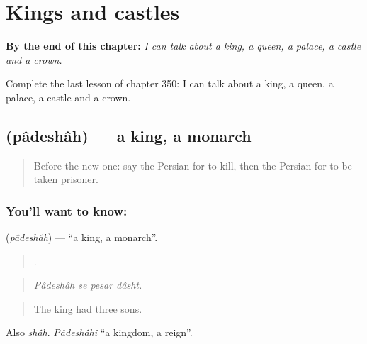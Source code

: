 
\chapter{Kings and castles}
\label{ch:fa-kings-and-castles}

\begin{chapteropening}
\textbf{By the end of this chapter:} \emph{I can talk about a king, a queen, a palace, a castle and a crown.}

Complete the last lesson of chapter 350: I can talk about a king, a queen, a palace, a castle and a crown.
\end{chapteropening}

\section[\texorpdfstring{\fa{پادشاه} (pâdeshâh)}{پادشاه (pâdeshâh)}]{ (pâdeshâh) — a king, a monarch}

\label{lesson:FA-C350-padeshah}



\begin{quote}
Before the new one: say the Persian for to kill, then the Persian for to be taken prisoner.
\end{quote}

\subsection*{You'll want to know: }
\textbf{} (\emph{pâdeshâh}) — \textquotedblleft{}a king, a monarch\textquotedblright{}.

\begin{quote}
   .
\end{quote}

\begin{quote}
\emph{Pâdeshâh se pesar dâsht.}
\end{quote}

\begin{quote}
The king had three sons.
\end{quote}

Also \emph{shâh}. \emph{Pâdeshâhi} \textquotedblleft{}a kingdom, a reign\textquotedblright{}.

